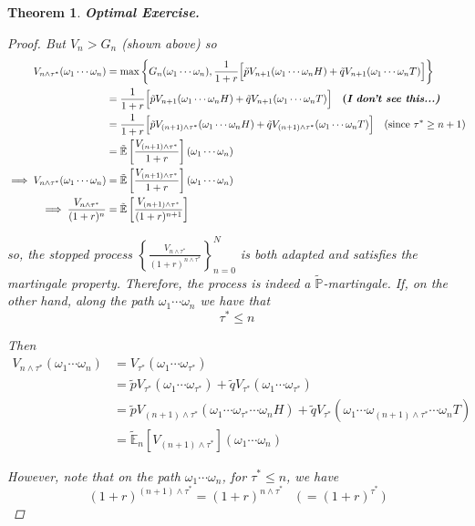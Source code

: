 \documentclass[12pt]{article}
\newtheorem{theorem}{Theorem}
\renewcommand{\P}{\mathbb P}
\newcommand{\E}{\mathbb E}
\begin{document}
\begin{theorem} {\bf Optimal Exercise.}
\begin{proof}
But $V_n > G_n$ (shown above) so
\begin{align*}
	V_{n\land\tau^*}(\omega_1\cdots\omega_n) &= \max \left\{ G_n(\omega_1\cdots\omega_n), \frac{1}{1 + r}\Big[\tilde{p}V_{n + 1}(\omega_1\cdots\omega_nH) + \tilde{q}V_{n + 1}(\omega_1\cdots\omega_nT) \Big]\right\} \\
	&= \frac{1}{1 + r}\Big[\tilde{p}V_{n + 1}(\omega_1\cdots\omega_nH) + \tilde{q}V_{n + 1}(\omega_1\cdots\omega_nT) \Big] \quad \text{{\bf(\em I don't see this...)}} \\
	&= \frac{1}{1 + r}\Big[\tilde{p}V_{(n + 1)\land\tau^*}(\omega_1\cdots\omega_nH) + \tilde{q}V_{(n + 1)\land\tau^*}(\omega_1\cdots\omega_nT) \Big] \quad \text{(since $\tau^* \geq n + 1$)} \\
	&= \tilde{\E} \left[ \frac{ V_{(n + 1)\land\tau^*} }{ 1 + r } \right](\omega_1\cdots\omega_n) \\
	\implies V_{n\land\tau^*}(\omega_1\cdots\omega_n) &= \tilde{\E} \left[ \frac{ V_{(n + 1)\land\tau^*} }{ 1 + r } \right](\omega_1\cdots\omega_n) \\
	\implies \frac{V_{n\land\tau^*}}{(1 + r)^n} &= \tilde{\E} \left[ \frac{ V_{(n + 1)\land\tau^*} }{ (1 + r)^{n + 1} } \right]
\end{align*}

so, the stopped process $\left\{ \frac{V_{n\land\tau^*} }{(1 + r)^{n\land\tau^*}} \right\}^N_{n = 0}$ is both adapted and satisfies the martingale property. Therefore, the process is indeed a $\tilde{\P}$-martingale. If, on the other hand, along the path $\omega_1\cdots\omega_n$ we have that
\begin{equation*}
	\tau^* \leq n
\end{equation*}

Then
\begin{align*}
	V_{n\land\tau^*}(\omega_1\cdots\omega_n) &= V_{\tau^*}(\omega_1\cdots\omega_{\tau^*}) \\
	&= \tilde{p}V_{\tau^*}(\omega_1\cdots\omega_{\tau^*}) + \tilde{q}V_{\tau^*}(\omega_1\cdots\omega_{\tau^*}) \\
	&= \tilde{p}V_{(n + 1)\land\tau^*}(\omega_1\cdots\omega_{\tau^*}\cdots\omega_nH) + \tilde{q}V_{\tau^*}(\omega_1\cdots\omega_{(n + 1)\land\tau^*}\cdots\omega_nT) \\
	&= \tilde{\E}_n \left[V_{(n + 1)\land\tau^*}\right](\omega_1\cdots\omega_n)
\end{align*}

However, note that on the path $\omega_1\cdots\omega_n$, for $\tau^* \leq n$, we have
\begin{equation*}
	(1 + r)^{(n + 1)\land\tau^*} = (1 + r)^{n \land \tau^*} \quad \big(\,=(1 + r)^{\tau^*}\,\big)
\end{equation*}


\end{proof}
\end{theorem}
\end{document}
